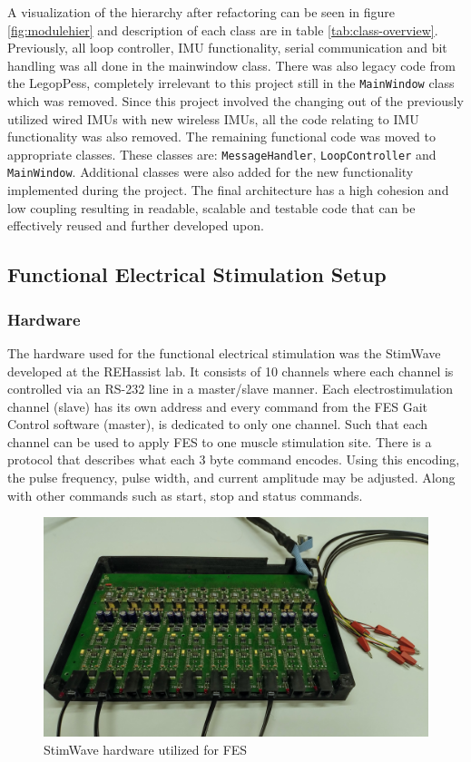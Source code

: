 A visualization of the hierarchy after refactoring can be seen in figure \ref{fig:modulehier} and description of each class are in table \ref{tab:class-overview}. Previously, all loop controller, IMU functionality, serial communication and bit handling was all done in the mainwindow class. There was also legacy code from the LegopPess, completely irrelevant to this project still in the \texttt{MainWindow} class which was removed. Since this project involved the changing out of the previously utilized wired IMUs with new wireless IMUs, all the code relating to IMU functionality was also removed. The remaining functional code was moved to appropriate classes. These classes are: \texttt{MessageHandler}, \texttt{LoopController} and \texttt{MainWindow}. Additional classes were also added for the new functionality implemented during the project. The final architecture has a high cohesion and low coupling resulting in readable, scalable and testable code that can be effectively reused and further developed upon.




\subsection{Functional Electrical Stimulation Setup}

\subsubsection{Hardware}
The hardware used for the functional electrical stimulation was the StimWave developed at the REHassist lab. It consists of 10 channels where each channel is controlled via an RS-232 line in a master/slave manner. Each electrostimulation channel (slave) has its own address and every command from the FES Gait Control software (master), is dedicated to only one channel. Such that each channel can be used to apply FES to one muscle stimulation site. There is a protocol that describes what each 3 byte command encodes. Using this encoding, the pulse frequency, pulse width, and current amplitude may be adjusted. Along with other commands such as start, stop and status commands. 

\begin{figure} [h]
    \centering
    \includegraphics[width=0.8\linewidth]{images/stimwave.jpg}
    \caption{StimWave hardware utilized for FES}
    \label{fig:stimwave}
\end{figure}

